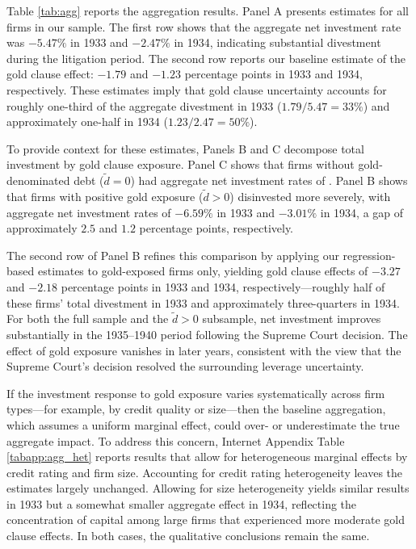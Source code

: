 Table \ref{tab:agg} reports the aggregation results. Panel A presents estimates for all firms in our sample. The first row shows that the aggregate net investment rate was $-5.47\%$ in 1933 and $-2.47\%$ in 1934, indicating substantial divestment during the litigation period. The second row reports our baseline estimate of the gold clause effect: $-1.79$ and $-1.23$ percentage points in 1933 and 1934, respectively. These estimates imply that gold clause uncertainty accounts for roughly one-third of the aggregate divestment in 1933 ($1.79/5.47 = 33\%$) and approximately one-half in 1934 ($1.23/2.47 = 50\%$).

To provide context for these estimates, Panels B and C decompose total investment by gold clause exposure. Panel C shows that firms without gold-denominated debt ($\tilde{d}=0$) had aggregate net investment rates of . Panel B shows that firms with positive gold exposure ($\tilde{d}>0$) disinvested more severely, with aggregate net investment rates of $-6.59\%$ in 1933 and $-3.01\%$ in 1934, a gap of approximately $2.5$ and $1.2$ percentage points, respectively. 

The second row of Panel B refines this comparison by applying our regression-based estimates to gold-exposed firms only, yielding gold clause effects of $-3.27$ and $-2.18$ percentage points in 1933 and 1934, respectively---roughly half of these firms' total divestment in 1933 and approximately three-quarters in 1934. For both the full sample and the $\tilde{d}>0$ subsample, net investment improves substantially in the 1935--1940 period following the Supreme Court decision. The effect of gold exposure vanishes in later years, consistent with the view that the Supreme Court's decision resolved the surrounding leverage uncertainty.

If the investment response to gold exposure varies systematically across firm types---for example, by credit quality or size---then the baseline aggregation, which assumes a uniform marginal effect, could over- or underestimate the true aggregate impact. To address this concern, Internet Appendix Table \ref{tabapp:agg_het} reports results that allow for heterogeneous marginal effects by credit rating and firm size. Accounting for credit rating heterogeneity leaves the estimates largely unchanged. Allowing for size heterogeneity yields similar results in 1933 but a somewhat smaller aggregate effect in 1934, reflecting the concentration of capital among large firms that experienced more moderate gold clause effects. In both cases, the qualitative conclusions remain the same.

